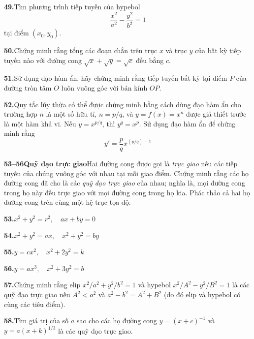 \setlength{\abovedisplayskip}{3.5pt}
\setlength{\belowdisplayskip}{3.5pt}
\setlength{\abovedisplayshortskip}{1.5pt}
\setlength{\belowdisplayshortskip}{1.5pt}

\noindent
\begin{minipage}[t]{0.485\textwidth}
\setlength{\parskip}{4.6pt}

\textbf{49.}\enspace Tìm phương trình tiếp tuyến của hypebol
\[
\frac{x^2}{a^2} - \frac{y^2}{b^2} = 1
\]
tại điểm $(x_0, y_0)$.

\textbf{50.}\enspace Chứng minh rằng tổng các đoạn chắn trên trục $x$ và trục $y$ của bất kỳ tiếp tuyến nào với đường cong $\sqrt{x} + \sqrt{y} = \sqrt{c}$ đều bằng $c$.

\textbf{51.}\enspace Sử dụng đạo hàm ẩn, hãy chứng minh rằng tiếp tuyến bất kỳ tại điểm $P$ của đường tròn tâm $O$ luôn vuông góc với bán kính $OP$.

\textbf{52.}\enspace Quy tắc lũy thừa có thể được chứng minh bằng cách dùng đạo hàm ẩn cho trường hợp $n$ là một số hữu tỉ, $n = p/q$, và $y = f(x) = x^n$ được giả thiết trước là một hàm khả vi. Nếu $y = x^{p/q}$, thì $y^q = x^p$. Sử dụng đạo hàm ẩn để chứng minh rằng
\[
y' = \frac{p}{q} x^{(p/q)-1}
\]

{\color{stewartblue}\textbf{53--56}}\enspace \textbf{Quỹ đạo trực giao}\enspace Hai đường cong được gọi là \textit{trực giao} nếu các tiếp tuyến của chúng vuông góc với nhau tại mỗi giao điểm. Chứng minh rằng các họ đường cong đã cho là các \textit{quỹ đạo trực giao} của nhau; nghĩa là, mọi đường cong trong họ này đều trực giao với mọi đường cong trong họ kia. Phác thảo cả hai họ đường cong trên cùng một hệ trục tọa độ.

\textbf{53.}\enspace $x^2 + y^2 = r^2, \quad ax + by = 0$

\textbf{54.}\enspace $x^2 + y^2 = ax, \quad x^2 + y^2 = by$

\textbf{55.}\enspace $y = cx^2, \quad x^2 + 2y^2 = k$

\textbf{56.}\enspace $y = ax^3, \quad x^2 + 3y^2 = b$

\textbf{57.}\enspace Chứng minh rằng elip $x^2/a^2 + y^2/b^2 = 1$ và hypebol $x^2/A^2 - y^2/B^2 = 1$ là các quỹ đạo trực giao nếu $A^2 < a^2$ và $a^2 - b^2 = A^2 + B^2$ (do đó elip và hypebol có cùng các tiêu điểm).

\textbf{58.}\enspace Tìm giá trị của số $a$ sao cho các họ đường cong $y = (x + c)^{-1}$ và $y = a(x + k)^{1/3}$ là các quỹ đạo trực giao.


\end{minipage}
